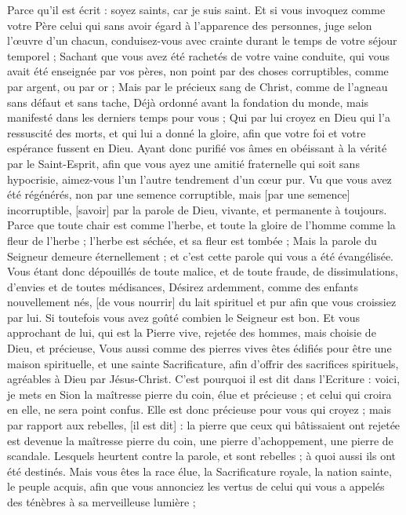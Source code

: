 \begin{multicols}{2}
Parce qu'il est écrit : soyez saints, car je suis saint.
Et si vous invoquez comme votre Père celui qui sans avoir égard à l'apparence des personnes, juge selon l'œuvre d'un chacun, conduisez-vous avec crainte durant le temps de votre séjour temporel ;
Sachant que vous avez été rachetés de votre vaine conduite, qui vous avait été enseignée par vos pères, non point par des choses corruptibles, comme par argent, ou par or ;
Mais par le précieux sang de Christ, comme de l'agneau sans défaut et sans tache,
Déjà ordonné avant la fondation du monde, mais manifesté dans les derniers temps pour vous ;
Qui par lui croyez en Dieu qui l'a ressuscité des morts, et qui lui a donné la gloire, afin que votre foi et votre espérance fussent en Dieu.
Ayant donc purifié vos âmes en obéissant à la vérité par le Saint-Esprit, afin que vous ayez une amitié fraternelle qui soit sans hypocrisie, aimez-vous l'un l'autre tendrement d'un cœur pur.
Vu que vous avez été régénérés, non par une semence corruptible, mais [par une semence] incorruptible, [savoir] par la parole de Dieu, vivante, et permanente à toujours.
Parce que toute chair est comme l'herbe, et toute la gloire de l'homme comme la fleur de l'herbe ; l'herbe est séchée, et sa fleur est tombée ;
Mais la parole du Seigneur demeure éternellement ; et c'est cette parole qui vous a été évangélisée.
\VerseOne{}Vous étant donc dépouillés de toute malice, et de toute fraude, de dissimulations, d'envies et de toutes médisances,
Désirez ardemment, comme des enfants nouvellement nés, [de vous nourrir] du lait spirituel et pur afin que vous croissiez par lui.
Si toutefois vous avez goûté combien le Seigneur est bon.
Et vous approchant de lui, qui est la Pierre vive, rejetée des hommes, mais choisie de Dieu, et précieuse,
Vous aussi comme des pierres vives êtes édifiés pour être une maison spirituelle, et une sainte Sacrificature, afin d'offrir des sacrifices spirituels, agréables à Dieu par Jésus-Christ.
C'est pourquoi il est dit dans l'Ecriture : voici, je mets en Sion la maîtresse pierre du coin, élue et précieuse ; et celui qui croira en elle, ne sera point confus.
Elle est donc précieuse pour vous qui croyez ; mais par rapport aux rebelles, [il est dit] : la pierre que ceux qui bâtissaient ont rejetée est devenue la maîtresse pierre du coin, une pierre d'achoppement, une pierre de scandale.
Lesquels heurtent contre la parole, et sont rebelles ; à quoi aussi ils ont été destinés.
Mais vous êtes la race élue, la Sacrificature royale, la nation sainte, le peuple acquis, afin que vous annonciez les vertus de celui qui vous a appelés des ténèbres à sa merveilleuse lumière ;

\end{multicols}
